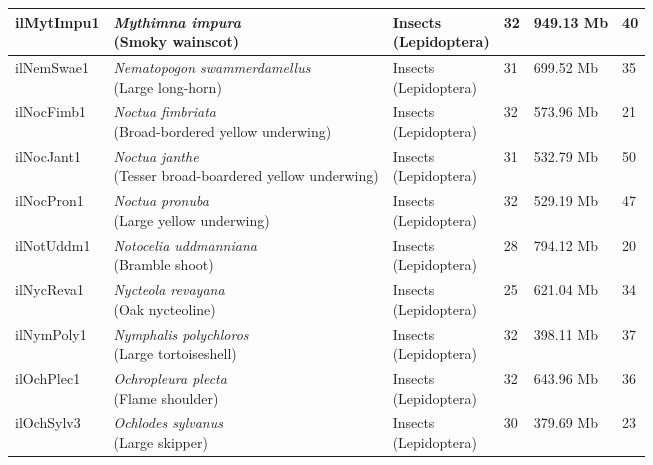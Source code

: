 \begin{centering}
\begin{longtable}{l|l|l|l|l|l}
ilMytImpu1 & \makecell[{l}]{\textit{Mythimna impura} \\ (Smoky wainscot)} & \makecell[{l}]{Insects \\ (Lepidoptera)} & 32 & 949.13 Mb & 40  \\ \hline
ilNemSwae1 & \makecell[{l}]{\textit{Nematopogon swammerdamellus} \\ (Large long-horn)} & \makecell[{l}]{Insects \\ (Lepidoptera)} & 31 & 699.52 Mb & 35  \\ \hline
ilNocFimb1 & \makecell[{l}]{\textit{Noctua fimbriata} \\ (Broad-bordered yellow underwing)} & \makecell[{l}]{Insects \\ (Lepidoptera)} & 32 & 573.96 Mb & 21  \\ \hline
ilNocJant1 & \makecell[{l}]{\textit{Noctua janthe} \\ (Tesser broad-boardered yellow underwing)} & \makecell[{l}]{Insects \\ (Lepidoptera)} & 31 & 532.79 Mb & 50  \\ \hline
ilNocPron1 & \makecell[{l}]{\textit{Noctua pronuba} \\ (Large yellow underwing)} & \makecell[{l}]{Insects \\ (Lepidoptera)} & 32 & 529.19 Mb & 47  \\ \hline
ilNotUddm1 & \makecell[{l}]{\textit{Notocelia uddmanniana} \\ (Bramble shoot)} & \makecell[{l}]{Insects \\ (Lepidoptera)} & 28 & 794.12 Mb & 20  \\ \hline
ilNycReva1 & \makecell[{l}]{\textit{Nycteola revayana} \\ (Oak nycteoline)} & \makecell[{l}]{Insects \\ (Lepidoptera)} & 25 & 621.04 Mb & 34  \\ \hline
ilNymPoly1 & \makecell[{l}]{\textit{Nymphalis polychloros} \\ (Large tortoiseshell)} & \makecell[{l}]{Insects \\ (Lepidoptera)} & 32 & 398.11 Mb & 37  \\ \hline
ilOchPlec1 & \makecell[{l}]{\textit{Ochropleura plecta} \\ (Flame shoulder)} & \makecell[{l}]{Insects \\ (Lepidoptera)} & 32 & 643.96 Mb & 36  \\ \hline
ilOchSylv3 & \makecell[{l}]{\textit{Ochlodes sylvanus} \\ (Large skipper)} & \makecell[{l}]{Insects \\ (Lepidoptera)} & 30 & 379.69 Mb & 23  \\ \hline

\end{longtable}
\end{centering}

